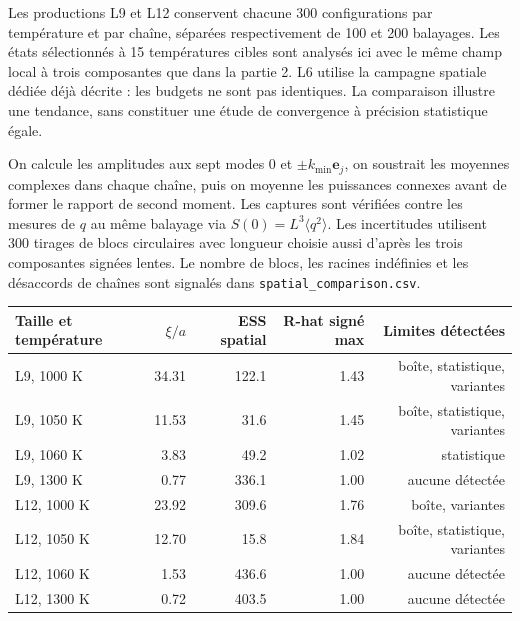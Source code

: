 Les productions L9 et L12 conservent chacune 300 configurations par température et par chaîne, séparées respectivement de 100 et 200 balayages. Les états sélectionnés à 15 températures cibles sont analysés ici avec le même champ local à trois composantes que dans la partie 2. L6 utilise la campagne spatiale dédiée déjà décrite : les budgets ne sont pas identiques. La comparaison illustre une tendance, sans constituer une étude de convergence à précision statistique égale.

On calcule les amplitudes aux sept modes $0$ et $\pm k_{\min}\mathbf e_j$, on soustrait les moyennes complexes dans chaque chaîne, puis on moyenne les puissances connexes avant de former le rapport de second moment. Les captures sont vérifiées contre les mesures de $q$ au même balayage via $S(0)=L^3\langle q^2\rangle$. Les incertitudes utilisent 300 tirages de blocs circulaires avec longueur choisie aussi d’après les trois composantes signées lentes. Le nombre de blocs, les racines indéfinies et les désaccords de chaînes sont signalés dans \texttt{spatial\_comparison.csv}.


\begin{center}\small\begin{tabular}{lrrrr}\toprule

Taille et température & $\xi/a$ & ESS spatial & R-hat signé max & Limites détectées\\\midrule

L9, 1000 K & 34.31 & 122.1 & 1.43 & boîte, statistique, variantes\\

L9, 1050 K & 11.53 & 31.6 & 1.45 & boîte, statistique, variantes\\

L9, 1060 K & 3.83 & 49.2 & 1.02 & statistique\\

L9, 1300 K & 0.77 & 336.1 & 1.00 & aucune détectée\\

L12, 1000 K & 23.92 & 309.6 & 1.76 & boîte, variantes\\

L12, 1050 K & 12.70 & 15.8 & 1.84 & boîte, statistique, variantes\\

L12, 1060 K & 1.53 & 436.6 & 1.00 & aucune détectée\\

L12, 1300 K & 0.72 & 403.5 & 1.00 & aucune détectée\\

\bottomrule\end{tabular}\end{center}

